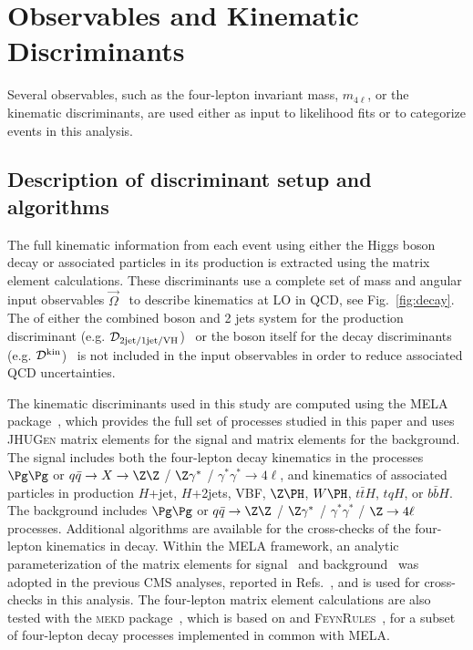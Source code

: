
\section{Observables and Kinematic Discriminants}
\label{sec:observables}

Several observables, such as the four-lepton invariant mass, $m_{4\ell}$, or the kinematic discriminants,
are used either as input to likelihood fits or to categorize events in this analysis. 


\subsection{Description of discriminant setup and algorithms}

The full kinematic information from each event using either the Higgs boson decay or associated
particles in its production is extracted using the matrix element calculations. 
These discriminants use a complete set of mass and angular
input observables $\vec\Omega$~\cite{Gao:2010qx,Anderson:2013afp,Gritsan:2016hjl} 
to describe kinematics at LO in QCD, see Fig.~\ref{fig:decay}.
The \PT of either the combined \PH boson and 2 jets system for the production discriminant
(e.g. $\mathcal{D}_{\rm 2jet/1jet/VH}$)~\cite{Khachatryan:2015cwa, Khachatryan:2015mma} 
or the \PH boson itself for the decay 
discriminants (e.g. $\mathcal{D}^{\rm kin}$)~\cite{Chatrchyan:2012ufa,Khachatryan:2014kca}
is not included in the input observables in order to reduce associated QCD uncertainties. 

The kinematic discriminants used in this study are computed using the {\sc MELA}
package~\cite{Chatrchyan:2012ufa,Gao:2010qx,Bolognesi:2012mm,Anderson:2013afp},
which provides the full set of processes studied in this paper and uses \textsc{JHUGen} matrix elements
for the signal and \MCFM matrix elements for the background. The signal includes both 
the four-lepton decay kinematics in the processes  $\Pg\Pg$ or 
$q\bar{q}\to X\to \Z\Z$ / $\Z\gamma^*$ / $\gamma^*\gamma^*\to4\ell$, and kinematics of
associated particles in production $H$+jet, $H$+2jets, VBF, $\Z\PH$, $W\PH$, $t\bar{t}H$, $tqH$, or $b\bar{b}H$. 
The background includes $\Pg\Pg$ or $q\bar{q}\to\Z\Z$ / $\Z\gamma^*$ / $\gamma^*\gamma^*$ / $\Z\to 4\ell$
processes. 
Additional algorithms are available for the cross-checks of the four-lepton kinematics in decay. 
Within the {\sc MELA} framework, an analytic parameterization of the matrix elements
for signal~\cite{Gao:2010qx,Bolognesi:2012mm} and background~\cite{Chen:2012jy} was adopted in the previous CMS
analyses, reported in Refs.~\cite{Chatrchyan:2012ufa,Chatrchyan:2013lba,Chatrchyan:2012jja}, and is used for
cross-checks in this analysis. 
The four-lepton matrix element calculations are also tested
with the \textsc{mekd} package~\cite{Avery:2012um}, which is based on \MADGRAPH
and \textsc{FeynRules}~\cite{Christensen:2008py}, for a subset of four-lepton decay 
processes implemented in common with {\sc MELA}.

